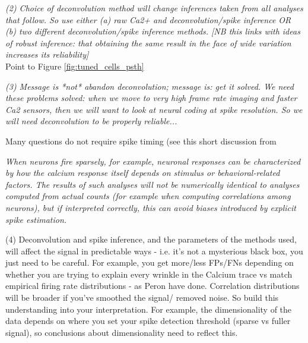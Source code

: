 \documentclass[a4paper,10pt,twocolumn]{article}
\begin{document}
\emph{(2) Choice of deconvolution method will change inferences taken from all analyses that follow. So use either (a) raw Ca2+ and deconvolution/spike inference OR (b) two different deconvolution/spike inference methods. [NB this links with ideas of robust inference: that obtaining the same result in the face of wide variation increases its reliability]}\\

Point to Figure \ref{fig:tuned_cells_psth}

\emph{(3) Message is *not* abandon deconvolution; message is: get it solved. We need these problems solved: when we move to very high frame rate imaging and faster Ca2 sensors, then we will want to look at neural coding at spike resolution. So we will need deconvolution to be properly reliable...}

Many questions do not require spike timing (see this short discussion from \cite{Harris2016-zo}

\begin{displayquote}\emph{When neurons fire sparsely, for example, neuronal responses can be characterized by how the calcium response itself depends on stimulus or behavioral-related factors. The results of such analyses will not be numerically identical to analyses computed from actual counts (for example when computing correlations among neurons), but if interpreted correctly, this can avoid biases introduced by explicit spike estimation.}
\end{displayquote}

(4) Deconvolution and spike inference, and the parameters of the methods used, will affect the signal in predictable ways - i.e. it's not a mysterious black box, you just need to be careful. For example, you get more/less FPs/FNs depending on whether you are trying to explain every wrinkle in the Calcium trace vs match empirical firing rate distributions - as Peron have done. Correlation distributions will be broader if you've smoothed the signal/ removed noise. So build this understanding into your interpretation.
For example, the dimensionality of the data depends on where you set your spike detection threshold (sparse vs fuller signal), so conclusions about dimensionality need to reflect this.\\
\end{document}
